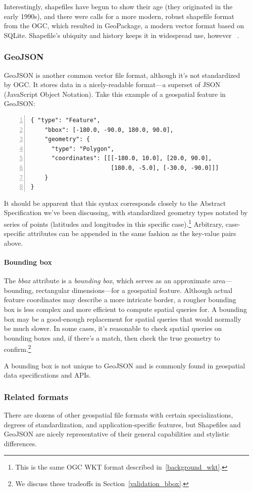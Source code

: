 Interestingly, shapefiles have begun to show their age (they originated in the early 1990s), and there were calls for a more modern, robust shapefile format from the OGC, which resulted in GeoPackage, a modern vector format based on SQLite. Shapefile's ubiquity and history keeps it in widespread use, however ~\cite{slashgeo,GeoPackage}.

\subsubsection{GeoJSON}
GeoJSON is another common vector file format, although it's not standardized by OGC. It stores data in a nicely-readable format---a superset of JSON (JavaScript Object Notation). Take this example of a geospatial feature in GeoJSON:

\begin{Verbatim}[samepage=true,baselinestretch=1,numbers=left,xleftmargin=12mm]
{ "type": "Feature",
    "bbox": [-180.0, -90.0, 180.0, 90.0],
    "geometry": {
      "type": "Polygon",
      "coordinates": [[[-180.0, 10.0], [20.0, 90.0],
                       [180.0, -5.0], [-30.0, -90.0]]]
    }
}
\end{Verbatim}

It should be apparent that this syntax corresponds closely to the Abstract Specification we've been discussing, with standardized geometry types notated by series of points (latitudes and longitudes in this specific case).\footnote{This is the same OGC WKT format described in~\ref{background_wkt}.} Arbitrary, case-specific attributes can be appended in the same fashion as the key-value pairs above.

\paragraph{Bounding box}
The \textit{bbox} attribute is a \textit{bounding box}, which serves as an approximate area---bounding, rectangular dimensions---for a geospatial feature. Although actual feature coordinates may describe a more intricate border, a rougher bounding box is less complex and more efficient to compute spatial queries for. A bounding box may be a good-enough replacement for spatial queries that would normally be much slower. In some cases, it's reasonable to check spatial queries on bounding boxes and, if there's a match, then check the true geometry to confirm.\footnote{We discuss these tradeoffs in Section~\ref{validation_bbox}.}

A bounding box is not unique to GeoJSON and is commonly found in geospatial data specifications and APIs.

\subsubsection{Related formats}
There are dozens of other geospatial file formats with certain specializations, degrees of standardization, and application-specific features, but Shapefiles and GeoJSON are nicely representative of their general capabilities and stylistic differences.